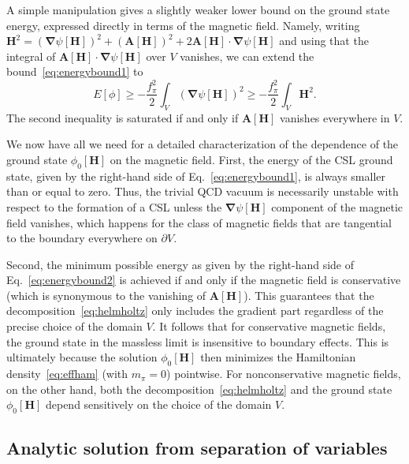 \documentclass[pdflatex,iicol,sn-mathphys-num]{sn-jnl}
\let\p=\phi
\let\de=\partial
\newcommand{\vek}[1]{\bm{#1}}%
\newcommand{\grad}{\vek\nabla}%
\begin{document}
A simple manipulation gives a slightly weaker lower bound on the ground state energy, expressed directly in terms of the magnetic field. Namely, writing $\vek H^2=(\grad\psi[\vek H])^2+(\vek A[\vek H])^2+2\vek A[\vek H]\cdot\grad\psi[\vek H]$ and using that the integral of $\vek A[\vek H]\cdot\grad\psi[\vek H]$ over $V$ vanishes, we can extend the bound~\eqref{eq:energybound1} to
\begin{equation}
E[\p]\geq-\frac{f_\pi^2}2\int_V(\grad\psi[\vek H])^2\geq-\frac{f_\pi^2}2\int_V\vek H^2.
\label{eq:energybound2}
\end{equation}
The second inequality is saturated if and only if $\vek A[\vek H]$ vanishes everywhere in $V$.

We now have all we need for a detailed characterization of the dependence of the ground state $\p_0[\vek H]$ on the magnetic field. First, the energy of the CSL ground state, given by the right-hand side of Eq.~\eqref{eq:energybound1}, is always smaller than or equal to zero. Thus, the trivial QCD vacuum is necessarily unstable with respect to the formation of a CSL unless the $\grad\psi[\vek H]$ component of the magnetic field vanishes, which happens for the class of magnetic fields that are tangential to the boundary everywhere on $\de V$.

Second, the minimum possible energy as given by the right-hand side of Eq.~\eqref{eq:energybound2} is achieved if and only if the magnetic field is conservative (which is synonymous to the vanishing of $\vek A[\vek H]$). This guarantees that the decomposition~\eqref{eq:helmholtz} only includes the gradient part regardless of the precise choice of the domain $V$. It follows that for conservative magnetic fields, the ground state in the massless limit is insensitive to boundary effects. This is ultimately because the solution $\p_0[\vek H]$ then minimizes the Hamiltonian density~\eqref{eq:effham} (with $m_\pi=0$) pointwise. For nonconservative magnetic fields, on the other hand, both the decomposition~\eqref{eq:helmholtz} and the ground state $\p_0[\vek H]$ depend sensitively on the choice of the domain $V$.


\subsection{Analytic solution from separation of variables}
\label{subsec:nonuniformBzeroMseparation}
\end{document}
